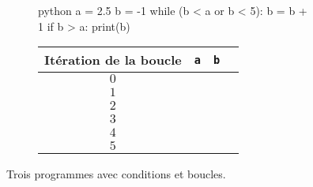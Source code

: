 \begin{figure}[h]
\begin{subfigure}{.5\textwidth}
\vspace{15pt}
\begin{mintedbox}{python}
a = 2.5
b = -1
while (b < a or b < 5):
	b = b + 1
	if b > a:
		print(b)
\end{mintedbox}
\end{subfigure}
\hfill
\begin{subfigure}{.45\textwidth}
	\begin{tabular}{|c|c|c|c|}\hline
		Itération de la boucle & \texttt{a} & \texttt{b} \\ \hline
		$0$ && \\ \hline
		$1$ && \\ \hline
		$2$ && \\ \hline
		$3$ && \\ \hline
		$4$ && \\ \hline
		$5$ && \\ \hline
	\end{tabular}
\end{subfigure}

\caption{Trois programmes avec conditions et boucles.}
\label{fig:2}
\end{figure}




